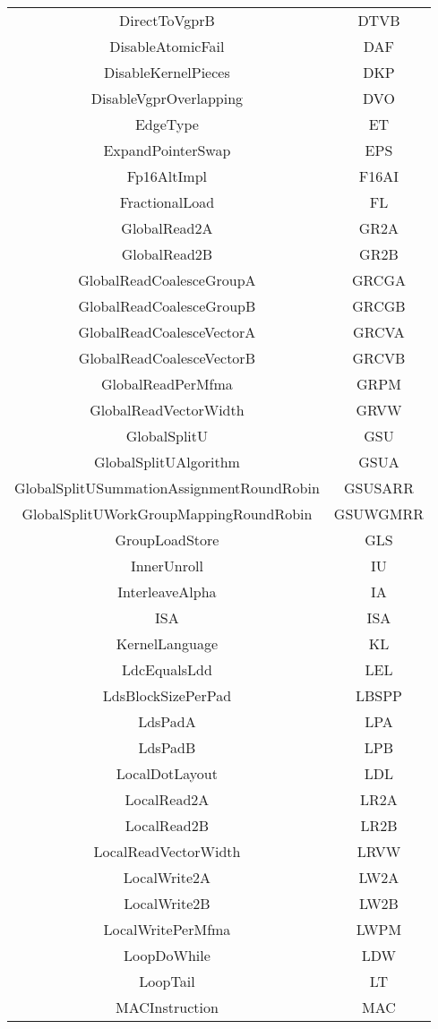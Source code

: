 \documentclass[]{article}
\begin{document}
\begin{center}
\begin{small}
\begin{longtable}{ |c|c| }
 DirectToVgprB & DTVB \\
 DisableAtomicFail & DAF \\
 DisableKernelPieces & DKP \\
 DisableVgprOverlapping & DVO \\
 EdgeType & ET \\
 ExpandPointerSwap & EPS \\
 Fp16AltImpl & F16AI \\
 FractionalLoad & FL \\
 GlobalRead2A & GR2A \\
 GlobalRead2B & GR2B \\
 GlobalReadCoalesceGroupA & GRCGA \\
 GlobalReadCoalesceGroupB & GRCGB \\
 GlobalReadCoalesceVectorA & GRCVA \\
 GlobalReadCoalesceVectorB & GRCVB \\
 GlobalReadPerMfma & GRPM \\
 GlobalReadVectorWidth & GRVW \\
 GlobalSplitU & GSU \\
 GlobalSplitUAlgorithm & GSUA \\
 GlobalSplitUSummationAssignmentRoundRobin & GSUSARR \\
 GlobalSplitUWorkGroupMappingRoundRobin & GSUWGMRR \\
 GroupLoadStore & GLS \\
 InnerUnroll & IU \\
 InterleaveAlpha & IA \\
 ISA & ISA \\
 KernelLanguage & KL \\
 LdcEqualsLdd & LEL \\
 LdsBlockSizePerPad & LBSPP \\
 LdsPadA & LPA \\
 LdsPadB & LPB \\
 LocalDotLayout & LDL \\
 LocalRead2A & LR2A \\
 LocalRead2B & LR2B \\
 LocalReadVectorWidth & LRVW \\
 LocalWrite2A & LW2A \\
 LocalWrite2B & LW2B \\
 LocalWritePerMfma & LWPM \\
 LoopDoWhile & LDW \\
 LoopTail & LT \\
 MACInstruction & MAC \\

\end{longtable}
\end{small}
\end{center}
\end{document}
